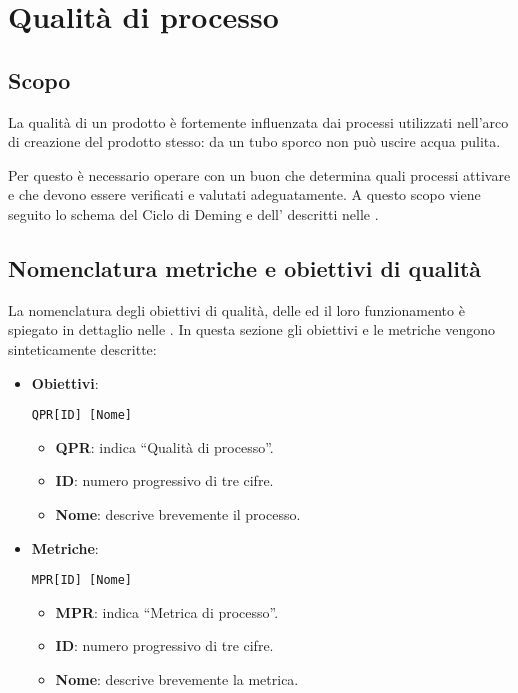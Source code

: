 \section{Qualità di processo}\label{qualità di processo}

\subsection{Scopo}
La qualità di un prodotto è fortemente influenzata dai processi utilizzati nell'arco di creazione del prodotto stesso: da un tubo sporco non può uscire acqua pulita.

Per questo è necessario operare con un buon  che
determina quali processi attivare e che devono essere verificati e valutati adeguatamente. A questo scopo viene seguito lo schema del Ciclo di Deming e dell' descritti nelle \NdPd.

\subsection{Nomenclatura metriche e obiettivi di qualità}  \label{nomenclatura}
La nomenclatura degli obiettivi di qualità, delle  ed il loro funzionamento è spiegato in dettaglio nelle \NdPd. In questa sezione gli obiettivi e le metriche vengono sinteticamente descritte:

	\begin{itemize}
		\item \textbf{Obiettivi}:

		\begin{center}
			\texttt{QPR[ID] [Nome]}
		\end{center}

		\begin{itemize}
			\item \textbf{QPR}: indica ``Qualità di processo''.
			\item \textbf{ID}: numero progressivo di tre cifre.
			\item \textbf{Nome}: descrive brevemente il processo.
		\end{itemize}

		\item \textbf{Metriche}:

		\begin{center}
			\texttt{MPR[ID] [Nome]}
		\end{center}

		\begin{itemize}
			\item \textbf{MPR}: indica ``Metrica di processo''.
			\item \textbf{ID}: numero progressivo di tre cifre.
			\item \textbf{Nome}: descrive brevemente la metrica.
		\end{itemize}

	\end{itemize}





